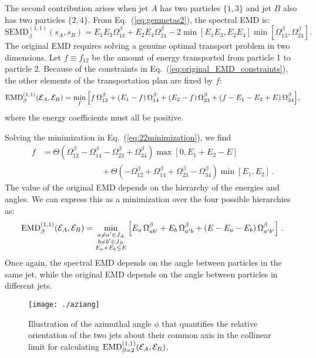 \documentclass[letterpaper,11pt]{article}
\DeclareRobustCommand{\Eq}[1]{Eq.~(\ref{#1})}
\begin{document}
The second contribution arises when jet $A$ has two particles $\{1,3\}$ and jet $B$ also has two particles $\{2,4\}$.
%
From \Eq{eq:genmetas2}, the spectral EMD is:
%
\begin{equation}
\text{SEMD}^{(1,1)}_\beta(s_A, s_B) = E_1 E_3\Omega_{13}^\beta + E_2 E_{4} \Omega_{24}^\beta -  2\min[E_1E_3,E_2E_4] \min[\Omega_{13}^\beta,\Omega_{24}^\beta].
\end{equation}
%
The original EMD requires solving a genuine optimal transport problem in two dimensions.
%
Let $f \equiv f_{12}$ be the amount of energy transported from particle 1 to particle 2.
%
Because of the constraints in \Eq{eq:original_EMD_constraints}, the other elements of the transportation plan are fixed by $f$:
%
\begin{equation}
\label{eq:22minimization}
\text{EMD}^{(1,1)}_{\beta}({\cal E}_A,{\cal E}_B) = \min_{f} \Big[ f \, \Omega_{12}^\beta + (E_1 - f) \, \Omega_{14}^\beta + (E_2 -f) \, \Omega_{23}^\beta + (f - E_1 - E_2 + E) \,\Omega_{34}^\beta  \Big],
\end{equation}
%
where the energy coefficients must all be positive.




Solving the minimization in \Eq{eq:22minimization}, we find
%
\begin{align}
f &= \Theta\left(
\Omega_{12}^\beta-\Omega_{14}^\beta-\Omega_{23}^\beta+\Omega_{34}^\beta
\right)\max[0,E_1+E_2-E] \\
&
\hspace{3cm}+ \Theta\left(
-\Omega_{12}^\beta+\Omega_{14}^\beta+\Omega_{23}^\beta-\Omega_{34}^\beta
\right)\min[E_1,E_2] \,.\nonumber
\end{align}
%
The value of the original EMD depends on the hierarchy of the energies and angles.
%
We can express this as a minimization over the four possible hierarchies as: 
%
\begin{equation}\label{eq:EMD11sol}
\text{EMD}^{(1,1)}_{\beta}({\cal E}_A,{\cal E}_B) = \min_{\substack{a\neq a'\in J_A\\b\neq b'\in J_B\\E_a+E_b\leq E}}\left[
E_a\,\Omega_{ab'}^\beta + E_b\, \Omega_{a'b}^\beta + (E-E_a-E_b)\,\Omega_{a'b'}^\beta
\right]\,.
\end{equation}
%
Once again, the spectral EMD depends on the angle between particles in the same jet, while the original EMD depends on the angle between particles in different jets.

\begin{figure}
\begin{center}
\texttt{[image: ./aziang]}
\caption{\label{fig:emdangs}
Illustration of the azimuthal angle $\phi$ that quantifies the relative orientation of the two jets about their common axis in the collinear limit for calculating $\text{EMD}^{(1,1)}_{\beta=2}({\cal E}_A,{\cal E}_B)$.
}
\end{center}
\end{figure}
\end{document}
